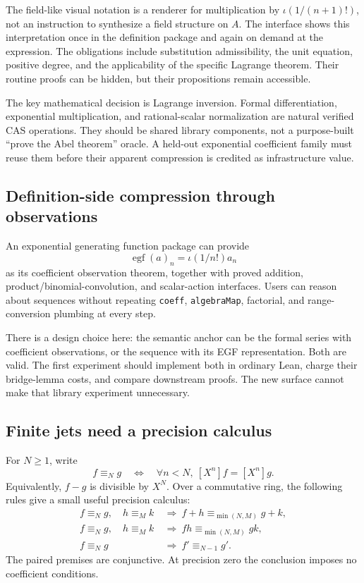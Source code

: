 \documentclass[11pt,letterpaper]{article}
\newcommand{\code}[1]{\nolinkurl{#1}}
\newcommand{\coeff}[2]{[#1^{#2}]}
\theoremstyle{definition}
\begin{document}
The field-like visual notation is a renderer for multiplication by
\(\iota(1/(n+1)!)\), not an instruction to synthesize a field structure on \(A\).
The interface shows this interpretation once in the definition package and again
on demand at the expression. The obligations include substitution admissibility,
the unit equation, positive degree, and the applicability of the specific
Lagrange theorem. Their routine proofs can be hidden, but their propositions
remain accessible.

The key mathematical decision is Lagrange inversion. Formal differentiation,
exponential multiplication, and rational-scalar normalization are natural verified
CAS operations. They should be shared library components, not a purpose-built
``prove the Abel theorem'' oracle. A held-out exponential coefficient family must
reuse them before their apparent compression is credited as infrastructure value.

\subsection{Definition-side compression through observations}
An exponential generating function package can provide
\[
 \operatorname{egf}(a)_n=\iota(1/n!)a_n
\]
as its coefficient observation theorem, together with proved addition,
product/binomial-convolution, and scalar-action interfaces. Users can reason about
sequences without repeating \code{coeff}, \code{algebraMap}, factorial, and
range-conversion plumbing at every step.

There is a design choice here: the semantic anchor can be the formal series with
coefficient observations, or the sequence with its EGF representation. Both are
valid. The first experiment should implement both in ordinary Lean, charge their
bridge-lemma costs, and compare downstream proofs. The new surface cannot make
that library experiment unnecessary.

\subsection{Finite jets need a precision calculus}\label{sec:precision}
For \(N\ge1\), write
\[
 f\equiv_N g\quad\Longleftrightarrow\quad
 \forall n<N,\ \coeff Xn f=\coeff Xn g.
\]
Equivalently, \(f-g\) is divisible by \(X^N\). Over a commutative ring, the following
rules give a small useful precision calculus:
\begin{align*}
 f\equiv_N g,\quad h\equiv_M k
 &\ \Longrightarrow\ f+h\equiv_{\min(N,M)}g+k,\\
 f\equiv_N g,\quad h\equiv_M k
 &\ \Longrightarrow\ fh\equiv_{\min(N,M)}gk,\\
 f\equiv_N g
 &\ \Longrightarrow\ f'\equiv_{N-1}g'.
\end{align*}
The paired premises are conjunctive. At precision zero the conclusion imposes no
coefficient conditions.
\end{document}
